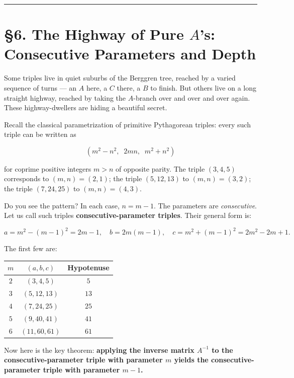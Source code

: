 \documentclass[11pt,openany]{book}
\theoremstyle{definition}
\theoremstyle{plain}
\theoremstyle{remark}
\begin{document}
\bigskip\noindent\rule{\textwidth}{0.4pt}\bigskip


\section{§6. The Highway of Pure $A$'s: Consecutive Parameters and Depth}


Some triples live in quiet suburbs of the Berggren tree, reached by a varied sequence of turns — an $A$ here, a $C$ there, a $B$ to finish. But others live on a long straight highway, reached by taking the $A$-branch over and over and over again. These highway-dwellers are hiding a beautiful secret.

Recall the classical parametrization of primitive Pythagorean triples: every such triple can be written as

$$(m^2 - n^2,\;\; 2mn,\;\; m^2 + n^2)$$

for coprime positive integers $m > n$ of opposite parity. The triple $(3, 4, 5)$ corresponds to $(m, n) = (2, 1)$; the triple $(5, 12, 13)$ to $(m, n) = (3, 2)$; the triple $(7, 24, 25)$ to $(m, n) = (4, 3)$.

Do you see the pattern? In each case, $n = m - 1$. The parameters are \textit{consecutive}. Let us call such triples \textbf{consecutive-parameter triples}. Their general form is:

$$a = m^2 - (m-1)^2 = 2m - 1, \quad b = 2m(m-1), \quad c = m^2 + (m-1)^2 = 2m^2 - 2m + 1.$$

The first few are:

\begin{center}
\begin{tabular}{c|c|c}
\toprule
$m$ & $(a, b, c)$ & Hypotenuse \\
\midrule
$2$ & $(3, 4, 5)$ & $5$ \\
$3$ & $(5, 12, 13)$ & $13$ \\
$4$ & $(7, 24, 25)$ & $25$ \\
$5$ & $(9, 40, 41)$ & $41$ \\
$6$ & $(11, 60, 61)$ & $61$ \\
\bottomrule
\end{tabular}
\end{center}


Now here is the key theorem: \textbf{applying the inverse matrix $A^{-1}$ to the consecutive-parameter triple with parameter $m$ yields the consecutive-parameter triple with parameter $m - 1$.}
\end{document}
